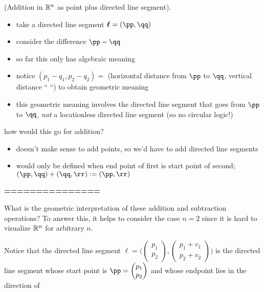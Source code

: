 \begin{deriv}
    (Addition in $\mathbb{R}^n$ as point plus directed line segment).
    
    \begin{itemize}
        \item take a directed line segment $\boldsymbol{\ell} = (\pp, \qq)$
        \item consider the difference $\pp - \qq$
        \item so far this only has algebraic meaning
        \item notice $(p_1 - q_1, p_2 - q_2) = $ (horizontal distance from $\pp$ to $\qq$, vertical distance `` ``) to obtain geometric meaning
        \item this geometric meaning involves the directed line segment that goes from $\pp$ to $\qq$, \textit{not} a locationless directed line segment (so no circular logic!)
    \end{itemize}
    
    how would this go for addition?
    \begin{itemize}
        \item doesn't make sense to add points, so we'd have to add directed line segments
        \item would only be defined when end point of first is start point of second; $(\pp, \qq) + (\qq, \rr) := (\pp, \rr)$
    \end{itemize}
    
    \textbf{===============}
    
    What is the geometric interpretation of these addition and subtraction operations? To answer this, it helps to consider the case $n = 2$ since it is hard to visualize $\mathbb{R}^n$ for arbitrary $n$.
    
    
    
    Notice that the directed line segment $\boldsymbol{\ell} = \Bigg( \begin{pmatrix} p_1 \\ p_2 \end{pmatrix}, \begin{pmatrix} p_1 + v_1 \\ p_2 + v_2 \end{pmatrix} \Bigg)$ is the directed line segment whose start point is $\pp = \begin{pmatrix} p_1 \\ p_2 \end{pmatrix}$ and whose endpoint lies in the direction of 
    

\end{deriv}
